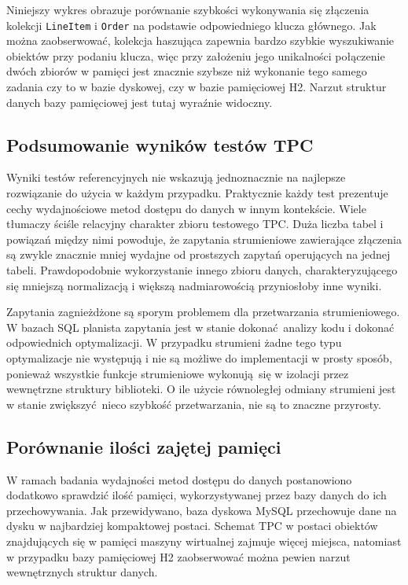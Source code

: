 \documentclass[12pt,twoside,openright]{extarticle}
\begin{document}
Niniejszy wykres obrazuje porównanie szybkości wykonywania się złączenia kolekcji \texttt{LineItem} i \texttt{Order} na podstawie odpowiedniego klucza głównego. Jak można zaobserwować, kolekcja haszująca zapewnia bardzo szybkie wyszukiwanie obiektów przy podaniu klucza, więc przy założeniu jego unikalności połączenie dwóch zbiorów w pamięci jest znacznie szybsze niż wykonanie tego samego zadania czy to w bazie dyskowej, czy w bazie pamięciowej H2. Narzut struktur danych bazy pamięciowej jest tutaj wyraźnie widoczny.

\subsection{Podsumowanie wyników testów TPC}

    Wyniki testów referencyjnych nie wskazują jednoznacznie na najlepsze rozwiązanie do użycia w każdym przypadku. Praktycznie każdy test prezentuje cechy wydajnościowe metod dostępu do danych w innym kontekście. Wiele tłumaczy ściśle relacyjny charakter zbioru testowego TPC. Duża liczba tabel i powiązań między nimi powoduje, że zapytania strumieniowe zawierające złączenia są zwykle znacznie mniej wydajne od prostszych zapytań operujących na jednej tabeli. Prawdopodobnie wykorzystanie innego zbioru danych, charakteryzującego się mniejszą normalizacją i większą nadmiarowością przyniosłoby inne wyniki. 

    Zapytania zagnieżdżone są sporym problemem dla przetwarzania strumieniowego. W bazach SQL planista zapytania jest w stanie dokonać analizy kodu i dokonać odpowiednich optymalizacji. W przypadku strumieni żadne tego typu optymalizacje nie występują i nie są możliwe do implementacji w prosty sposób, ponieważ wszystkie funkcje strumieniowe wykonują się w izolacji przez wewnętrzne struktury biblioteki. O ile użycie równoległej odmiany strumieni jest w stanie zwiększyć nieco szybkość przetwarzania, nie są to znaczne przyrosty.


\subsection{Porównanie ilości zajętej pamięci}

    W ramach badania wydajności metod dostępu do danych postanowiono dodatkowo sprawdzić ilość pamięci, wykorzystywanej przez bazy danych do ich przechowywania. Jak przewidywano, baza dyskowa MySQL przechowuje dane na dysku w najbardziej kompaktowej postaci. Schemat TPC w postaci obiektów znajdujących się w pamięci maszyny wirtualnej zajmuje więcej miejsca, natomiast w przypadku bazy pamięciowej H2 zaobserwować można pewien narzut wewnętrznych struktur danych.
\end{document}

